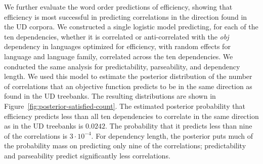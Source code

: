 \documentclass[12pt]{article}
\begin{document}
We further evaluate the word order predictions of efficiency, showing that efficiency is most successful in predicting correlations in the direction found in the UD corpora.
We constructed a single logistic model predicting, for each of the ten dependencies, whether it is correlated or anti-correlated with the \emph{obj} dependency in languages optimized for efficiency, with random effects for language and language family, correlated across the ten dependencies.
We conducted the same analysis for predictability, parseability, and dependency length.
We used this model to estimate the posterior distribution of the number of correlations that an objective function predicts to be in the same direction as found in the UD treebanks.
The resulting distributions are shown in Figure~\ref{fig:posterior-satisfied-count}.
The estimated posterior probability that efficiency predicts less than all ten dependencies to correlate in the same direction as in the UD treebanks is $0.0242$. The probability that it predicts less than nine of the correlations is $3\cdot 10^{-4}$.
For dependency length, the posterior puts much of the probability mass on predicting only nine of the correlations; predictability and parseability predict significantly less correlations.










\end{document}
